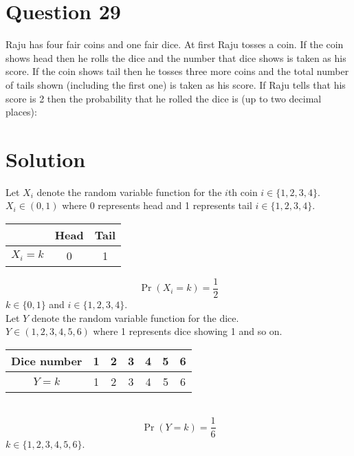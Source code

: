 \documentclass[journal,12pt,twocolumn]{IEEEtran}
\begin{document}
\section*{Question 29}
Raju has four fair coins and one fair dice. At first Raju tosses a coin. If the coin shows head then he rolls the dice and the number that dice shows is taken as his score. If the coin shows tail then he tosses three more coins and the total number of tails shown (including the first one) is taken as his score. If Raju tells that his score is 2 then the probability that he rolled the dice is (up to two decimal places):

\section*{Solution}
Let $X_i$ denote the random variable function for the $i$th coin $i\in\{1,2,3,4\}$.\\
$X_i\in(0,1)$ where 0 represents head and 1 represents tail $i\in\{1,2,3,4\}$.
\\[5pt]
\begin{tabular}{|c|c|c|}
\hline
     &Head&Tail  \\
     \hline
     $X_i=k$&0&1\\
     \hline
\end{tabular}
\begin{equation}\label{coin}
\Pr(X_i=k)=\dfrac{1}{2} 
\end{equation}
$k\in\{0,1\}$ and $i\in\{1,2,3,4\}$.
\\
Let $Y$ denote the random variable function for the dice.\\
$Y\in(1,2,3,4,5,6)$ where 1 represents dice showing 1 and so on.
\\[5pt]
\begin{tabular}{|c|c|c|c|c|c|c|}
\hline
     Dice number&1&2&3&4&5&6  \\
     \hline
     $Y=k$&1&2&3&4&5&6\\
     \hline
\end{tabular}
\\
\begin{equation}\label{dice}
\Pr(Y=k)=\dfrac{1}{6} 
\end{equation}
$k\in\{1,2,3,4,5,6\}$.
\\[20pt]
\end{document}
